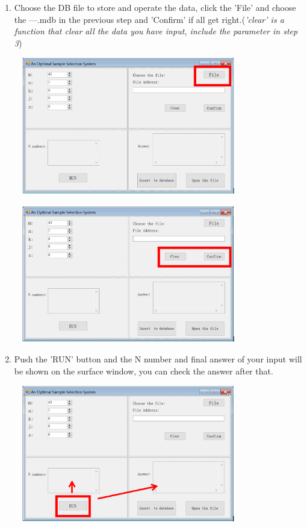 \begin{enumerate}
\item Choose the DB file to store and operate the data, click the 'File' and choose the ---.mdb in the previous step and 'Confirm' if all get right.(\textit{'clear' is a function that clear all the data you have input, include the parameter in step 3})
\begin{center}
    \includegraphics[width=10cm,height=6cm]{images/step2.PNG}
\end{center}
\begin{center}
    \includegraphics[width=10cm,height=6cm]{images/step3.PNG}
\end{center}

\item Push the 'RUN' button and the N number and final answer of your input will be shown on the surface window, you can check the answer after that.
\begin{center}
    \includegraphics[width=10cm,height=6cm]{images/step4.PNG}
\end{center}


\end{enumerate}
